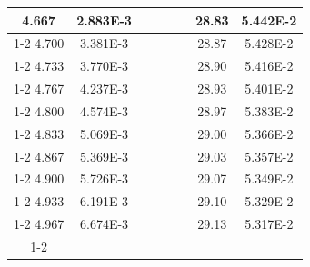 \documentclass[article,12pt]{elsarticle}
\begin{document}
\begin{longtable}[c]{|c|c|cccccc}
4.667    & 2.883E-3  &                       &                              &                            & \multicolumn{1}{c|}{} & \multicolumn{1}{c|}{28.83}   & \multicolumn{1}{c|}{5.442E-2} \\ \cline{1-2} \cline{7-8} 
4.700    & 3.381E-3  &                       &                              &                            & \multicolumn{1}{c|}{} & \multicolumn{1}{c|}{28.87}   & \multicolumn{1}{c|}{5.428E-2} \\ \cline{1-2} \cline{7-8} 
4.733    & 3.770E-3  &                       &                              &                            & \multicolumn{1}{c|}{} & \multicolumn{1}{c|}{28.90}   & \multicolumn{1}{c|}{5.416E-2} \\ \cline{1-2} \cline{7-8} 
4.767    & 4.237E-3  &                       &                              &                            & \multicolumn{1}{c|}{} & \multicolumn{1}{c|}{28.93}   & \multicolumn{1}{c|}{5.401E-2} \\ \cline{1-2} \cline{7-8} 
4.800    & 4.574E-3  &                       &                              &                            & \multicolumn{1}{c|}{} & \multicolumn{1}{c|}{28.97}   & \multicolumn{1}{c|}{5.383E-2} \\ \cline{1-2} \cline{7-8} 
4.833    & 5.069E-3  &                       &                              &                            & \multicolumn{1}{c|}{} & \multicolumn{1}{c|}{29.00}   & \multicolumn{1}{c|}{5.366E-2} \\ \cline{1-2} \cline{7-8} 
4.867    & 5.369E-3  &                       &                              &                            & \multicolumn{1}{c|}{} & \multicolumn{1}{c|}{29.03}   & \multicolumn{1}{c|}{5.357E-2} \\ \cline{1-2} \cline{7-8} 
4.900    & 5.726E-3  &                       &                              &                            & \multicolumn{1}{c|}{} & \multicolumn{1}{c|}{29.07}   & \multicolumn{1}{c|}{5.349E-2} \\ \cline{1-2} \cline{7-8} 
4.933    & 6.191E-3  &                       &                              &                            & \multicolumn{1}{c|}{} & \multicolumn{1}{c|}{29.10}   & \multicolumn{1}{c|}{5.329E-2} \\ \cline{1-2} \cline{7-8} 
4.967    & 6.674E-3  &                       &                              &                            & \multicolumn{1}{c|}{} & \multicolumn{1}{c|}{29.13}   & \multicolumn{1}{c|}{5.317E-2} \\ \cline{1-2} \cline{7-8} 

\end{longtable}
\end{document}
